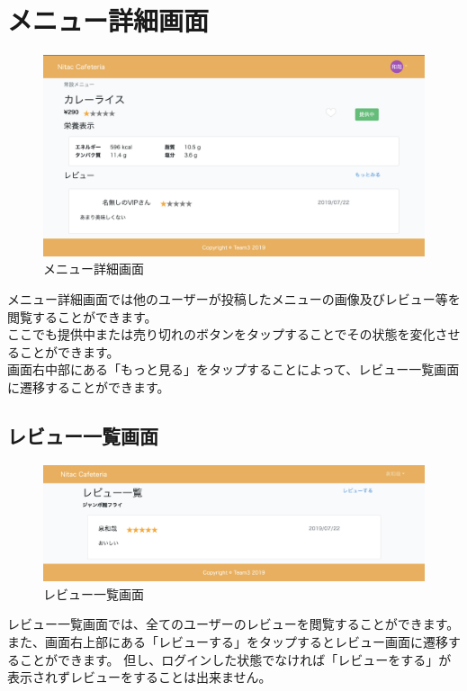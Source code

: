 \documentclass[a4paper]{jsarticle}
\begin{document}
\section{メニュー詳細画面}
\begin{figure}[htbp]
\centering
	\caption{メニュー詳細画面}
	\includegraphics[scale = 0.225]{image/detail.png}
\end{figure}
メニュー詳細画面では他のユーザーが投稿したメニューの画像及びレビュー等を閲覧することができます。\\
ここでも提供中または売り切れのボタンをタップすることでその状態を変化させることができます。\\
画面右中部にある「もっと見る」をタップすることによって、レビュー一覧画面に遷移することができます。\\
\subsection{レビュー一覧画面}
\begin{figure}[htbp]
\centering
	\caption{レビュー一覧画面}
	\includegraphics[scale = 0.225]{image/review.png}
\end{figure}
レビュー一覧画面では、全てのユーザーのレビューを閲覧することができます。\\
また、画面右上部にある「レビューする」をタップするとレビュー画面に遷移することができます。
但し、ログインした状態でなければ「レビューをする」が表示されずレビューをすることは出来ません。\\
\newpage
\end{document}

